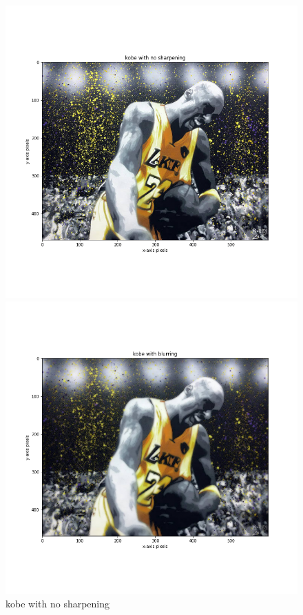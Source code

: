\documentclass{article}
\begin{document}
\begin{figure}[!htb]
    \includegraphics[width=\linewidth]{kobe with no sharpening.png}
    \caption{kobe with no sharpening}\label{fig:awesome_image1}
\endminipage
{}
    \includegraphics[width=\linewidth]{kobe with blurring.png}

\end{figure}
\end{document}
